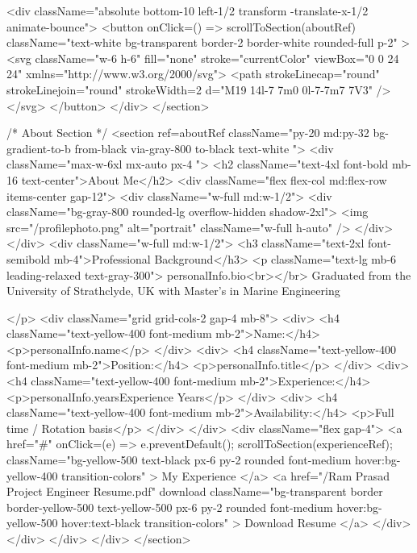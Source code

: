 {        <div className="absolute bottom-10 left-1/2 transform -translate-x-1/2 animate-bounce">
          <button
            onClick={() => scrollToSection(aboutRef)}
            className="text-white bg-transparent border-2 border-white rounded-full p-2"
          >
            <svg className="w-6 h-6" fill="none" stroke="currentColor" viewBox="0 0 24 24" xmlns="http://www.w3.org/2000/svg">
              <path strokeLinecap="round" strokeLinejoin="round" strokeWidth={2} d="M19 14l-7 7m0 0l-7-7m7 7V3" />
            </svg>
          </button>
        </div>
      </section>

      {/* About Section */}
      <section
        ref={aboutRef}
        className="py-20 md:py-32 bg-gradient-to-b from-black via-gray-800 to-black text-white ">
        <div className="max-w-6xl mx-auto px-4 ">
          <h2 className="text-4xl font-bold mb-16 text-center">About Me</h2>
          <div className="flex flex-col md:flex-row items-center gap-12">
            <div className="w-full md:w-1/2">
              <div className="bg-gray-800 rounded-lg overflow-hidden shadow-2xl">
                <img src="/profilephoto.png" alt="portrait" className="w-full h-auto" />
              </div>
            </div>
            <div className="w-full md:w-1/2">
              <h3 className="text-2xl font-semibold mb-4">Professional Background</h3>
              <p className="text-lg mb-6 leading-relaxed text-gray-300">
                {personalInfo.bio}<br></br>
                Graduated from the University of Strathclyde, UK with Master's in Marine Engineering 
                
              </p>
              <div className="grid grid-cols-2 gap-4 mb-8">
                <div>
                  <h4 className="text-yellow-400 font-medium mb-2">Name:</h4>
                  <p>{personalInfo.name}</p>
                </div>
                <div>
                  <h4 className="text-yellow-400 font-medium mb-2">Position:</h4>
                  <p>{personalInfo.title}</p>
                </div>
                <div>
                  <h4 className="text-yellow-400 font-medium mb-2">Experience:</h4>
                  <p>{personalInfo.yearsExperience} Years</p>
                </div>
                <div>
                  <h4 className="text-yellow-400 font-medium mb-2">Availability:</h4>
                  <p>Full time / Rotation basis</p>
                </div>
              </div>
              <div className="flex gap-4">
                <a 
                  href="#" 
                  onClick={(e) => {e.preventDefault(); scrollToSection(experienceRef);}}
                  className="bg-yellow-500 text-black px-6 py-2 rounded font-medium hover:bg-yellow-400 transition-colors"
                >
                  My Experience
                </a>
                <a 
                  href="/Ram Prasad Project Engineer Resume.pdf" 
                  download
                  className="bg-transparent border border-yellow-500 text-yellow-500 px-6 py-2 rounded font-medium hover:bg-yellow-500 hover:text-black transition-colors"
                >
                  Download Resume
                </a>
              </div>
            </div>
          </div>
        </div>
      </section>

}
